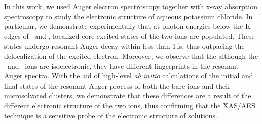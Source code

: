 In this work, we used Auger electron spectroscopy together with x-ray absorption spectroscopy to study the electronic structure of aqueous potassium chloride. In particular, we demonstrate experimentally that at photon energies below the K-edges of \ki~and \cli, localized core excited states of the two ions are populated. These states undergo resonant Auger decay within less than 1\,fs, thus outpacing the delocalization of the excited electron. Moreover, we observe that the although the \ki~and \cli~ions are isoelectronic, they have different fingerprints in the resonant Auger spectra. With the aid of high-level {\it ab initio} calculations of the initial and final states of the resonant Auger process of both the bare ions and their microsolvated clusters, we demonstrate that these differences are a result of the different electronic structure of the two ions, thus confirming that the XAS/AES technique is a sensitive probe of the electronic structure of solutions.


